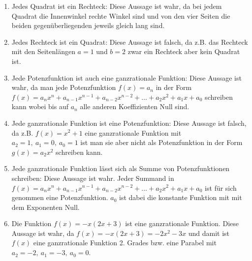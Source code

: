\begin{Answer}[ref=ganzHauptA2]

	\begin{minipage}{\textwidth}
	\begin{enumerate}[label=\alph*)]
		\item Jedes Quadrat ist ein Rechteck: Diese Aussage ist wahr, da bei jedem Quadrat die Innenwinkel rechte Winkel sind und von den vier Seiten die beiden gegenüberliegenden jeweils gleich lang sind.
		\item Jedes Rechteck ist ein Quadrat: Diese Aussage ist falsch, da z.B. das Rechteck mit den Seitenlängen \(a=1\) und \(b=2\) zwar ein Rechteck aber kein Quadrat ist. 
		\item Jede Potenzfunktion ist auch eine ganzrationale Funktion: Diese Aussage ist wahr, da man jede Potenzfunktion \(f(x)=a_n\) in der Form \(f(x)=a_nx^n+a_{n-1}x^{n-1}+a_{n-2}x^{n-2}+\dots +a_2x^2+a_1x+a_0\) schreiben kann wobei bis auf \(a_n\) alle anderen Koeffizienten Null sind. 
		\item Jede ganzrationale Funktion ist eine Potenzfunktion: Diese Aussage ist falsch, da z.B. \(f(x)=x^2+1\) eine ganzrationale Funktion mit \(a_2=1,\ a_1=0,\ a_0=1\) ist man sie aber nicht als Potenzfunktion in der Form \(g(x)=a_2x^2\) schreiben kann.
		\item Jede ganzrationale Funktion lässt sich als Summe von Potenzfunktionen schreiben: Diese Aussage ist wahr. Jeder Summand in \(f(x)=a_nx^n+a_{n-1}x^{n-1}+a_{n-2}x^{n-2}+\dots +a_2x^2+a_1x+a_0\) ist für sich genommen eine Potenzfunktion. \(a_0\) ist dabei die konstante Funktion mit mit dem Exponenten Null.
		\item Die Funktion \(f(x)=-x(2x+3)\) ist eine ganzrationale Funktion. Diese Aussage ist wahr, da \(f(x)=-x(2x+3)=-2x^2-3x\) und damit ist \(f(x)\) eine ganzrationale Funktion 2. Grades bzw. eine Parabel mit \(a_2=-2,\ a_1=-3,\ a_0=0\).
	\end{enumerate}
\end{minipage}%
\end{Answer}

